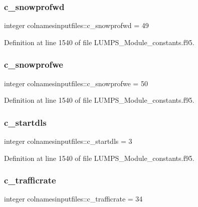 \subsubsection{\texorpdfstring{c\+\_\+snowprofwd}{c\_snowprofwd}}
{\footnotesize\ttfamily integer colnamesinputfiles\+::c\+\_\+snowprofwd = 49}



Definition at line 1540 of file L\+U\+M\+P\+S\+\_\+\+Module\+\_\+constants.\+f95.

\mbox{\label{namespacecolnamesinputfiles_a251ecc3acc1ca0dcae1be9dbc9885baf}} 
\subsubsection{\texorpdfstring{c\+\_\+snowprofwe}{c\_snowprofwe}}
{\footnotesize\ttfamily integer colnamesinputfiles\+::c\+\_\+snowprofwe = 50}



Definition at line 1540 of file L\+U\+M\+P\+S\+\_\+\+Module\+\_\+constants.\+f95.

\mbox{\label{namespacecolnamesinputfiles_a654ffd5c6d266efea6259fbea77c8ef1}} 
\subsubsection{\texorpdfstring{c\+\_\+startdls}{c\_startdls}}
{\footnotesize\ttfamily integer colnamesinputfiles\+::c\+\_\+startdls = 3}



Definition at line 1540 of file L\+U\+M\+P\+S\+\_\+\+Module\+\_\+constants.\+f95.

\mbox{\label{namespacecolnamesinputfiles_a1313118ff1eaf23efd4bd5404c07ca1b}} 
\subsubsection{\texorpdfstring{c\+\_\+trafficrate}{c\_trafficrate}}
{\footnotesize\ttfamily integer colnamesinputfiles\+::c\+\_\+trafficrate = 34}



